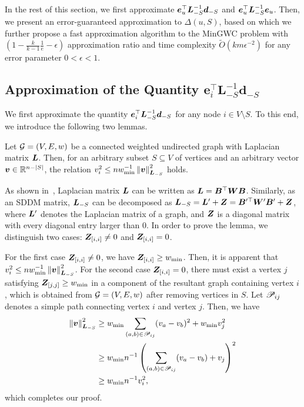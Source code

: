 \documentclass[10pt,twocolumn,twoside]{IEEEtran}
\begin{document}
In the rest of this section, we first approximate $\boldsymbol{e}_u^\top \boldsymbol{L}_{-S}^{-1} \boldsymbol{d}_{-S}$ and $\boldsymbol{e}_u^\top \boldsymbol{L}_{-S}^{-1}\boldsymbol{e}_u$. Then, we present an  error-guaranteed approximation to  \(\Delta(u,S)\), based on which we further propose  a fast approximation algorithm to the MinGWC problem  with $(1-\frac{k}{k-1} \frac{1}{e}-\epsilon)$ approximation ratio and time complexity $\tilde{O}(km\epsilon^{-2})$ for any error parameter $0< \epsilon < 1$.


\subsection{Approximation of the Quantity $\mathbf{e}_i^\top \mathbf{L}_{-S}^{-1}\mathbf{d}_{-S}$}

We first  approximate the quantity \(\boldsymbol{e}_i^\top\boldsymbol{L}_{-S}^{-1}\boldsymbol{d}_{-S}\) for any node $i\in V\setminus S$. To this end, we introduce the following two lemmas.
\begin{lemma}\label{lem:norm-ineq}
    Let \(\mathcal{G}=(V,E,w)\) be a connected weighted undirected graph with Laplacian matrix  \(\boldsymbol{L}\). Then, for an arbitrary subset \(S\subseteq V\) of vertices and an arbitrary vector \(\boldsymbol{v}\in\mathbb{R}^{n-\left|S \right|}\), the relation \(v_i^2\le nw_{\min}^{-1}\left\Vert\boldsymbol{v}\right\Vert^2_{\boldsymbol{L}_{-S}}\) holds.
\end{lemma}
\begin{IEEEproof}
    As shown in~, Laplacian matrix $\boldsymbol{L}$ can be written as \(\boldsymbol{L}=\boldsymbol{B}^\top\boldsymbol{W}\boldsymbol{B}\).   Similarly, as an SDDM matrix, \(\boldsymbol{L}_{-S}\) can be decomposed as \(\boldsymbol{L}_{-S}=\boldsymbol{L}'+\boldsymbol{Z}=\boldsymbol{B}'^\top\boldsymbol{W}'\boldsymbol{B}'+\boldsymbol{Z}\), where \(\boldsymbol{L}'\) denotes the Laplacian matrix of a  graph, and \(\boldsymbol{Z}\) is a diagonal matrix with every diagonal entry  larger than 0. In order to prove the lemma, we distinguish two cases:  \(\boldsymbol{Z}_{[i,i]}\neq0\) and  \(\boldsymbol{Z}_{[i,i]}=0\).

    For the first case \(\boldsymbol{Z}_{[i,i]}\neq0\),  we have \(\boldsymbol{Z}_{[i,i]}\ge w_{\min}\). Then, it is apparent that \(v_i^2\le nw_{\min}^{-1}\left\Vert\boldsymbol{v}\right\Vert^2_{\boldsymbol{L}_{-S}}\). For the second case  \(\boldsymbol{Z}_{[i,i]}=0\), there must exist a vertex \(j\)  satisfying \(\boldsymbol{Z}_{[j,j]}\ge w_{\min}\) in a component of the resultant graph containing vertex \(i\), which is obtained from \(\mathcal{G}=(V,E,w)\) after removing vertices in \(S\).    Let \(\mathscr{P}_{ij}\) denotes a simple path connecting vertex \(i\) and vertex \(j\). Then, we have
    \begin{align*}
        \left\Vert\boldsymbol{v}\right\Vert^2_{\boldsymbol{L}_{-S}}
         & \ge w_{\min}\sum_{\left( a,b \right)\in\mathscr{P}_{ij}}(v_a-v_b)^2+w_{\min}v_j^2     \\
         & \ge w_{\min}n^{-1}\left( \sum_{\left( a,b \right)\in\mathscr{P}_{ij}}(v_a-v_b)+v_j \right)^2 \\
         & \ge w_{\min}n^{-1}v_i^2,
    \end{align*}
    which completes our proof.
\end{IEEEproof}
\end{document}
